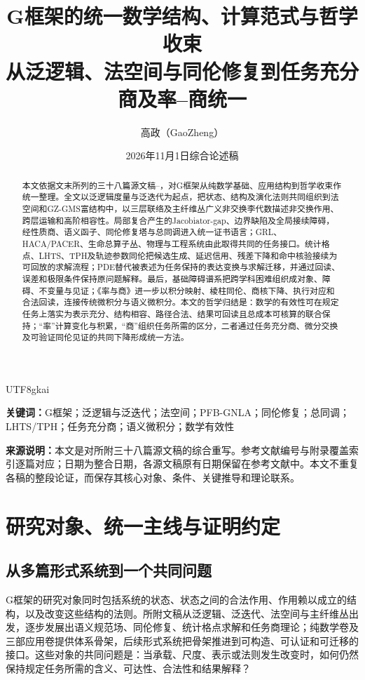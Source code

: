 \documentclass[11pt,a4paper]{article}
\title{\bfseries G框架的统一数学结构、计算范式与哲学收束\\[0.65em]\large 从泛逻辑、法空间与同伦修复到任务充分商及率--商统一}
\author{高政（GaoZheng）}
\date{2026年11月1日\quad 综合论述稿}
\theoremstyle{plain}
\theoremstyle{definition}
\theoremstyle{remark}
\begin{document}
\begin{CJK*}{UTF8}{gkai}
\maketitle
\thispagestyle{empty}
\begin{abstract}
本文依据文末所列的三十八篇源文稿\cite{S01}--\cite{S38}，对G框架从纯数学基础、应用结构到哲学收束作统一整理。全文以泛逻辑度量与泛迭代为起点，把状态、结构及演化法则共同组织到法空间和GZ-GMS富结构中，以三层联络及主纤维丛广义非交换李代数描述非交换作用、跨层运输和高阶相容性。局部复合产生的Jacobiator-gap、边界缺陷及全局接续障碍，经性质商、语义函子、同伦修复塔与总同调进入统一证书语言；GRL、HACA/PACER、生命总算子丛、物理与工程系统由此取得共同的任务接口。统计格点、LHTS、TPH及轨迹参数同伦把候选生成、延迟信用、残差下降和命中核验接续为可回放的求解流程；PDE替代被表述为任务保持的表达变换与求解迁移，并通过回读、误差和极限条件保持原问题解释。最后，基础障碍谱系把跨学科困难组织成对象、障碍、不变量与见证；《率与商》进一步以积分映射、棱柱同伦、商核下降、执行对应和合法回读，连接传统微积分与语义微积分。本文的哲学归结是：数学的有效性可在规定任务上落实为表示充分、结构相容、路径合法、结果可回读且总成本可核算的联合保持；“率”计算变化与积累，“商”组织任务所需的区分，二者通过任务充分商、微分交换及可验证同伦见证的共同下降形成统一方法。
\end{abstract}
\noindent\textbf{关键词：}G框架；泛逻辑与泛迭代；法空间；PFB-GNLA；同伦修复；总同调；LHTS/TPH；任务充分商；语义微积分；数学有效性
\par\vspace{0.8em}
\noindent\textbf{来源说明：}本文是对所附三十八篇源文稿的综合重写。参考文献编号与附录覆盖索引逐篇对应；日期为整合日期，各源文稿原有日期保留在参考文献中。本文不重复各稿的整段论证，而保存其核心对象、条件、关键推导和理论联系。
\clearpage
\setcounter{tocdepth}{2}
\tableofcontents
\clearpage


\section{研究对象、统一主线与证明约定}
\label{sec:introduction}

\subsection{从多篇形式系统到一个共同问题}
G框架的研究对象同时包括系统的状态、状态之间的合法作用、作用赖以成立的结构，以及改变这些结构的法则。所附文稿从泛逻辑、泛迭代、法空间与主纤维丛出发，逐步发展出语义规范场、同伦修复、统计格点求解和任务商理论；纯数学卷及三部应用卷提供体系骨架，后续形式系统把骨架推进到可构造、可认证和可迁移的接口\cite{S01,S02,S03,S04,S37,S38}。这些对象的共同问题是：当承载、尺度、表示或法则发生改变时，如何仍然保持规定任务所需的含义、可达性、合法性和结果解释？


\end{CJK*}
\end{document}
